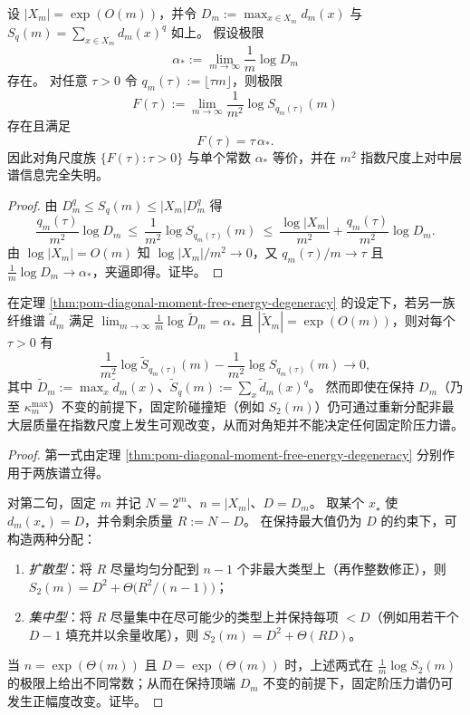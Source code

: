 \begin{theorem}\label{thm:pom-diagonal-moment-free-energy-degeneracy}
设 \(|X_m|=\exp(O(m))\)，并令
\(
D_m:=\max_{x\in X_m} d_m(x)
\)
与
\(
S_q(m)=\sum_{x\in X_m} d_m(x)^q
\)
如上。
假设极限
\[
\alpha_*:=\lim_{m\to\infty}\frac{1}{m}\log D_m
\]
存在。
对任意 \(\tau>0\) 令 \(q_m(\tau):=\lfloor\tau m\rfloor\)，则极限
\[
F(\tau):=\lim_{m\to\infty}\frac{1}{m^2}\log S_{q_m(\tau)}(m)
\]
存在且满足
\[
\boxed{\;F(\tau)=\tau\,\alpha_*.\;}
\]
因此对角尺度族 \(\{F(\tau):\tau>0\}\) 与单个常数 \(\alpha_*\) 等价，并在 \(m^2\) 指数尺度上对中层谱信息完全失明。
\end{theorem}
\begin{proof}
由 \(D_m^{q}\le S_q(m)\le |X_m|D_m^q\) 得
\[
\frac{q_m(\tau)}{m^2}\log D_m
\ \le\
\frac{1}{m^2}\log S_{q_m(\tau)}(m)
\ \le\
\frac{\log|X_m|}{m^2}+\frac{q_m(\tau)}{m^2}\log D_m.
\]
由 \(\log|X_m|=O(m)\) 知 \(\log|X_m|/m^2\to 0\)，又 \(q_m(\tau)/m\to\tau\) 且 \(\frac{1}{m}\log D_m\to\alpha_*\)，夹逼即得。证毕。
\end{proof}

\begin{corollary}\label{cor:pom-diagonal-observation-strong-unidentifiability}
在定理 \ref{thm:pom-diagonal-moment-free-energy-degeneracy} 的设定下，若另一族纤维谱 \(\tilde d_m\) 满足
\(
\lim_{m\to\infty}\frac{1}{m}\log \tilde D_m=\alpha_*
\)
且 \(|\tilde X_m|=\exp(O(m))\)，则对每个 \(\tau>0\) 有
\[
\frac{1}{m^2}\log \tilde S_{q_m(\tau)}(m)-\frac{1}{m^2}\log S_{q_m(\tau)}(m)\to 0,
\]
其中 \(\tilde D_m:=\max_x \tilde d_m(x)\)、\(\tilde S_q(m):=\sum_x \tilde d_m(x)^q\)。
然而即使在保持 \(D_m\)（乃至 \(\kappa_m^{\mathrm{max}}\)）不变的前提下，固定阶碰撞矩（例如 \(S_2(m)\)）仍可通过重新分配非最大层质量在指数尺度上发生可观改变，从而对角矩并不能决定任何固定阶压力谱。
\end{corollary}
\begin{proof}
第一式由定理 \ref{thm:pom-diagonal-moment-free-energy-degeneracy} 分别作用于两族谱立得。
\par
对第二句，固定 \(m\) 并记 \(N=2^m\)、\(n=|X_m|\)、\(D=D_m\)。
取某个 \(x_\star\) 使 \(d_m(x_\star)=D\)，并令剩余质量 \(R:=N-D\)。
在保持最大值仍为 \(D\) 的约束下，可构造两种分配：
\begin{enumerate}
  \item \emph{扩散型}：将 \(R\) 尽量均匀分配到 \(n-1\) 个非最大类型上（再作整数修正），则
  \(
  S_2(m)=D^2+\Theta\!\bigl(R^2/(n-1)\bigr)
  \)；
  \item \emph{集中型}：将 \(R\) 尽量集中在尽可能少的类型上并保持每项 \(<D\)（例如用若干个 \(D-1\) 填充并以余量收尾），则
  \(
  S_2(m)=D^2+\Theta(RD)
  \)。
\end{enumerate}
当 \(n=\exp(\Theta(m))\) 且 \(D=\exp(\Theta(m))\) 时，上述两式在 \(\frac1m\log S_2(m)\) 的极限上给出不同常数；从而在保持顶端 \(D_m\) 不变的前提下，固定阶压力谱仍可发生正幅度改变。证毕。
\end{proof}

